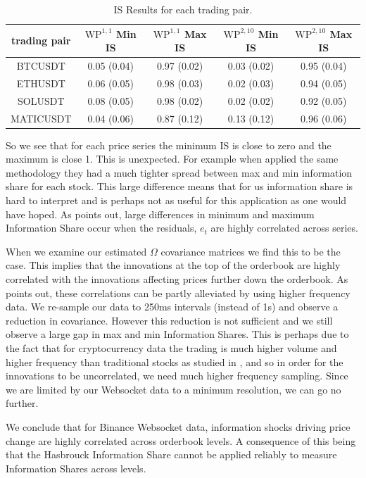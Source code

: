 \begin{table}[H]
    \begin{center}
        \begin{tabular}{ccccc}
            \toprule
            trading pair    & $\text{WP}^{1,1}$ Min IS & $\text{WP}^{1,1}$ Max IS & $\text{WP}^{2,10}$ Min IS & $\text{WP}^{2,10}$ Max IS \\
            \midrule
            BTCUSDT   & 0.05 (0.04)  & 0.97 (0.02)   & 0.03 (0.02) & 0.95 (0.04)   \\
            ETHUSDT   & 0.06 (0.05)  & 0.98 (0.03)   & 0.02 (0.03) & 0.94 (0.05)  \\
            SOLUSDT   & 0.08 (0.05)     & 0.98 (0.02)  & 0.02 (0.02) & 0.92 (0.05)   \\
            MATICUSDT &   0.04 (0.06)    & 0.87 (0.12)  & 0.13 (0.12) & 0.96 (0.06)  \\
            \bottomrule
        \end{tabular}
        \caption{IS Results for each trading pair.}
    \label{table:1}
    \end{center}
\end{table}

So we see that for each price series the minimum IS is close to zero and the maximum is close 1.
This is unexpected. For example when \cite{CAO2009} applied the same methodology they
had a much tighter spread between max and min information share for each stock.
This large difference means that for us information share is hard to interpret and 
is perhaps not as useful for this application as one would have hoped.
As \cite{YAN2010} points out, large differences in minimum and maximum Information Share
occur when the residuals, $e_t$ are highly correlated across series.

When we examine our estimated $\Omega$ covariance matrices we find this to be the case.
This implies that the innovations at the top of the orderbook are highly correlated
with the innovations affecting prices further down the orderbook. As \cite{KARABIYIK2022}
points out, these correlations can be partly alleviated by using higher frequency data.
We re-sample our data to 250ms intervals (instead of 1s) and observe a reduction
in covariance. However this reduction is not sufficient and we still observe a large gap in max and min Information Shares.
This is perhaps due to the fact that
for cryptocurrency data the trading is much higher volume and higher frequency
than traditional stocks as studied in \cite{CAO2009}, and so in order for the 
innovations to be uncorrelated, we need much higher frequency sampling.
Since we are limited by our Websocket data to a minimum resolution, we can go no further. 

We conclude that for Binance Websocket data, information shocks
driving price change are highly correlated across orderbook levels.
A consequence of this being that the Hasbrouck Information Share cannot be applied reliably
to measure Information Shares across levels.

